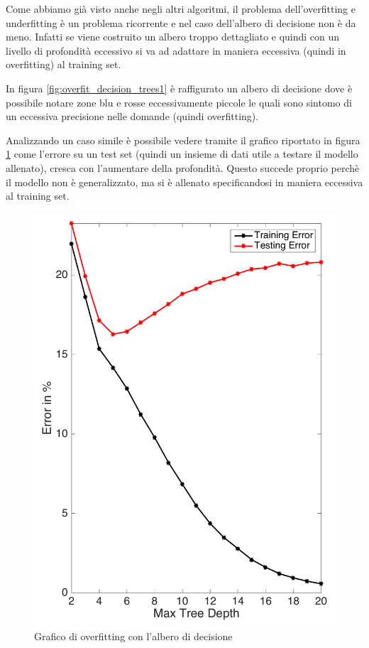 \documentclass[12pt,italian]{report}
\begin{document}
Come abbiamo già visto anche negli altri algoritmi, il problema dell'overfitting e underfitting è un problema ricorrente e nel caso dell'albero di decisione non è da meno.
Infatti se viene costruito un albero troppo dettagliato e quindi con un livello di profondità eccessivo si va ad adattare in maniera eccessiva (quindi in overfitting) al training set. 

In figura \ref{fig:overfit_decision_trees1} è raffigurato un albero di decisione dove è possibile notare zone blu e rosse eccessivamente piccole le quali sono sintomo di un eccessiva precisione nelle domande (quindi overfitting).

Analizzando un caso simile è possibile vedere tramite il grafico riportato in figura \ref{fig:overfit_decision_trees2} come l'errore su un test set (quindi un insieme di dati utile a testare il modello allenato), cresca con l'aumentare della profondità. Questo succede proprio perchè il modello non è generalizzato, ma si è allenato specificandosi in maniera eccessiva al training set.

\begin{figure}[h!]
	\center
	\includegraphics[scale=0.18]{../img/overfit_decision_trees2} %
	\caption{Grafico di overfitting con l'albero di decisione}
	\label{fig:overfit_decision_trees2}
\end{figure}
\end{document}
